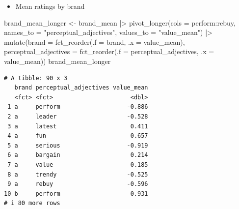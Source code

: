 \documentclass[
  ignorenonframetext,
]{beamer}
\newenvironment{Shaded}{\begin{snugshade}}{\end{snugshade}}
\newcommand{\AttributeTok}[1]{\textcolor[rgb]{0.40,0.45,0.13}{#1}}
\newcommand{\FunctionTok}[1]{\textcolor[rgb]{0.28,0.35,0.67}{#1}}
\newcommand{\NormalTok}[1]{\textcolor[rgb]{0.00,0.23,0.31}{#1}}
\newcommand{\OtherTok}[1]{\textcolor[rgb]{0.00,0.23,0.31}{#1}}
\newcommand{\SpecialCharTok}[1]{\textcolor[rgb]{0.37,0.37,0.37}{#1}}
\newcommand{\StringTok}[1]{\textcolor[rgb]{0.13,0.47,0.30}{#1}}
\providecommand{\tightlist}{%
  \setlength{\itemsep}{0pt}\setlength{\parskip}{0pt}}\usepackage{longtable,booktabs,array}
\begin{document}
\begin{frame}[fragile]{}
\label{section-9}
\begin{itemize}
\tightlist
\item
  Mean ratings by brand
\end{itemize}

\tiny

\begin{Shaded}
\begin{Highlighting}[]
\NormalTok{brand\_mean\_longer }\OtherTok{\textless{}{-}}\NormalTok{ brand\_mean }\SpecialCharTok{|\textgreater{}} 
  \FunctionTok{pivot\_longer}\NormalTok{(}\AttributeTok{cols =}\NormalTok{ perform}\SpecialCharTok{:}\NormalTok{rebuy,}
               \AttributeTok{names\_to =} \StringTok{"perceptual\_adjectives"}\NormalTok{,}
               \AttributeTok{values\_to =} \StringTok{"value\_mean"}\NormalTok{) }\SpecialCharTok{|\textgreater{}} 
  \FunctionTok{mutate}\NormalTok{(}\AttributeTok{brand =} \FunctionTok{fct\_reorder}\NormalTok{(}\AttributeTok{.f =}\NormalTok{ brand, }\AttributeTok{.x =}\NormalTok{ value\_mean),}
         \AttributeTok{perceptual\_adjectives =} \FunctionTok{fct\_reorder}\NormalTok{(}\AttributeTok{.f =}\NormalTok{ perceptual\_adjectives, }\AttributeTok{.x =}\NormalTok{ value\_mean))}
\NormalTok{brand\_mean\_longer}
\end{Highlighting}
\end{Shaded}

\begin{verbatim}
# A tibble: 90 x 3
   brand perceptual_adjectives value_mean
   <fct> <fct>                      <dbl>
 1 a     perform                   -0.886
 2 a     leader                    -0.528
 3 a     latest                     0.411
 4 a     fun                        0.657
 5 a     serious                   -0.919
 6 a     bargain                    0.214
 7 a     value                      0.185
 8 a     trendy                    -0.525
 9 a     rebuy                     -0.596
10 b     perform                    0.931
# i 80 more rows
\end{verbatim}
\end{frame}
\end{document}

